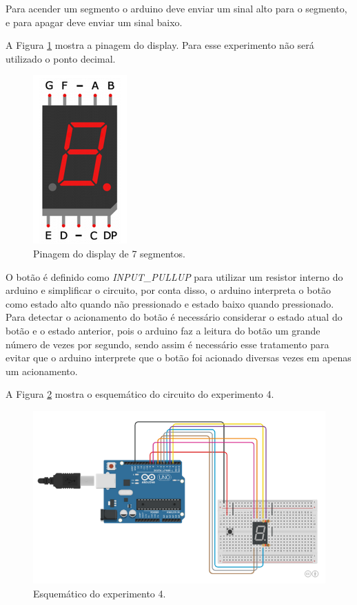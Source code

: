 \documentclass[12pt]{article}
\begin{document}
	Para acender um segmento o arduino deve enviar um sinal alto para o segmento, e para apagar deve enviar um sinal baixo.

	A Figura \ref{figPinosDisplay} mostra a pinagem do display. Para esse experimento não será utilizado o ponto decimal.

	\begin{figure}[h!]
		\centering
		\includegraphics[scale=0.5]{Imagens/Experimentos/4-Display7Seg/pinosDisplay.png}
		\caption{Pinagem do display de 7 segmentos.}
		\label{figPinosDisplay}
	\end{figure}

	O botão é definido como \textit{INPUT\_PULLUP} para utilizar um resistor interno do arduino e simplificar o circuito, por conta disso, o arduino interpreta o botão como estado alto quando não pressionado e estado baixo quando pressionado. Para detectar o acionamento do botão é necessário considerar o estado atual do botão e o estado anterior, pois o arduino faz a leitura do botão um grande número de vezes por segundo, sendo assim é necessário esse tratamento para evitar que o arduino interprete que o botão foi acionado diversas vezes em apenas um acionamento.

	A Figura \ref{figExp4cod} mostra o esquemático do circuito do experimento 4.

	\begin{figure}[h!]
		\centering
		\includegraphics[scale=0.3]{Imagens/Experimentos/4-Display7Seg/esquematico.png}
		\caption{Esquemático do experimento 4.}
		\label{figExp4cod}
	\end{figure}
\end{document}

